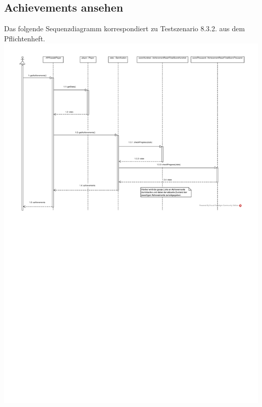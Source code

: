 \documentclass[a4paper]{scrreprt}
\begin{document}
	\subsection{Achievements ansehen}
	Das folgende Sequenzdiagramm korrespondiert zu Testszenario 8.3.2. aus dem Pflichtenheft. \\
	\includegraphics[width=\textwidth]{img/Achievements_ansehen.pdf}
\end{document}
